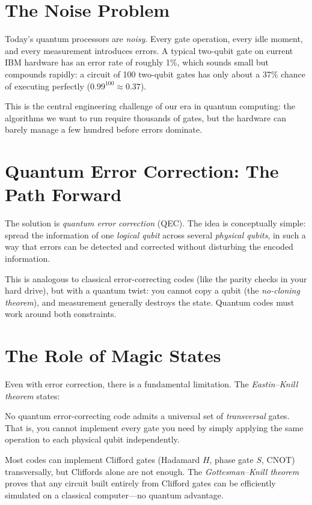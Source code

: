 \documentclass[11pt,a4paper,twoside]{report}
\theoremstyle{definition}
\begin{document}
\section{The Noise Problem}

Today's quantum processors are \emph{noisy}. Every gate operation, every
idle moment, and every measurement introduces errors. A typical
two-qubit gate on current IBM hardware has an error rate of roughly 1\%,
which sounds small but compounds rapidly: a circuit of 100 two-qubit
gates has only about a 37\% chance of executing perfectly
($0.99^{100} \approx 0.37$).

This is the central engineering challenge of our era in quantum
computing: the algorithms we want to run require thousands of gates, but
the hardware can barely manage a few hundred before errors dominate.

\section{Quantum Error Correction: The Path Forward}

The solution is \emph{quantum error correction} (QEC). The idea is
conceptually simple: spread the information of one \emph{logical qubit}
across several \emph{physical qubits}, in such a way that errors can be
detected and corrected without disturbing the encoded information.

This is analogous to classical error-correcting codes (like the parity
checks in your hard drive), but with a quantum twist: you cannot copy
a qubit (the \emph{no-cloning theorem}), and measurement generally
destroys the state. Quantum codes must work around both constraints.

\section{The Role of Magic States}

Even with error correction, there is a fundamental limitation.
The \emph{Eastin--Knill theorem} states:

\begin{concept}[title={The Eastin--Knill Theorem}]
No quantum error-correcting code admits a universal set of
\emph{transversal} gates. That is, you cannot implement every gate you
need by simply applying the same operation to each physical qubit
independently.
\end{concept}

Most codes can implement Clifford gates (Hadamard $H$, phase gate $S$,
CNOT) transversally, but Cliffords alone are not enough. The
\emph{Gottesman--Knill theorem} proves that any circuit built entirely
from Clifford gates can be efficiently simulated on a classical
computer---no quantum advantage.
\end{document}
